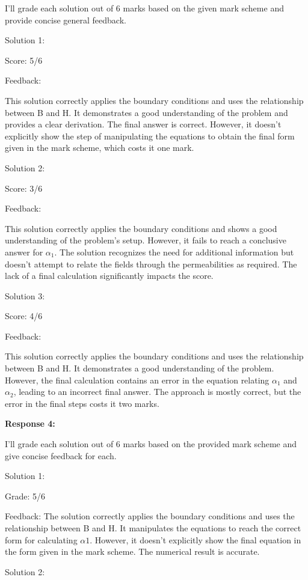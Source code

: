 \documentclass[a4paper,11pt]{article}
\begin{document}
I'll grade each solution out of 6 marks based on the given mark scheme and provide concise general feedback.

Solution 1:

Score: 5/6

Feedback:

This solution correctly applies the boundary conditions and uses the relationship between B and H. It demonstrates a good understanding of the problem and provides a clear derivation. The final answer is correct. However, it doesn't explicitly show the step of manipulating the equations to obtain the final form given in the mark scheme, which costs it one mark.

Solution 2:

Score: 3/6

Feedback:

This solution correctly applies the boundary conditions and shows a good understanding of the problem's setup. However, it fails to reach a conclusive answer for \(\alpha_1\). The solution recognizes the need for additional information but doesn't attempt to relate the fields through the permeabilities as required. The lack of a final calculation significantly impacts the score.

Solution 3:

Score: 4/6

Feedback:

This solution correctly applies the boundary conditions and uses the relationship between B and H. It demonstrates a good understanding of the problem. However, the final calculation contains an error in the equation relating \(\alpha_1\) and \(\alpha_2\), leading to an incorrect final answer. The approach is mostly correct, but the error in the final steps costs it two marks.

\bigskip
\textbf{Response 4:}

I'll grade each solution out of 6 marks based on the provided mark scheme and give concise feedback for each.

Solution 1:

Grade: 5/6

Feedback: The solution correctly applies the boundary conditions and uses the relationship between B and H. It manipulates the equations to reach the correct form for calculating \(\alpha1\). However, it doesn't explicitly show the final equation in the form given in the mark scheme. The numerical result is accurate.

Solution 2:
\end{document}
